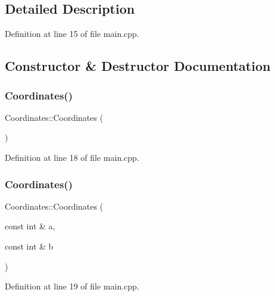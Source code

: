 \subsection{Detailed Description}


Definition at line 15 of file main.\+cpp.



\subsection{Constructor \& Destructor Documentation}
\mbox{\label{class_coordinates_a89dd10af87d803fd51dfd9987f32e8cd}} 
\subsubsection{\texorpdfstring{Coordinates()}{Coordinates()}\hspace{0.1cm}{\footnotesize\ttfamily [1/2]}}
{\footnotesize\ttfamily Coordinates\+::\+Coordinates (\begin{DoxyParamCaption}{ }\end{DoxyParamCaption})\hspace{0.3cm}{\ttfamily [inline]}}



Definition at line 18 of file main.\+cpp.

\mbox{\label{class_coordinates_a77ac76bd12242e5367c0770688abe263}} 
\subsubsection{\texorpdfstring{Coordinates()}{Coordinates()}\hspace{0.1cm}{\footnotesize\ttfamily [2/2]}}
{\footnotesize\ttfamily Coordinates\+::\+Coordinates (\begin{DoxyParamCaption}\item[{const int \&}]{a,  }\item[{const int \&}]{b }\end{DoxyParamCaption})\hspace{0.3cm}{\ttfamily [inline]}}



Definition at line 19 of file main.\+cpp.



